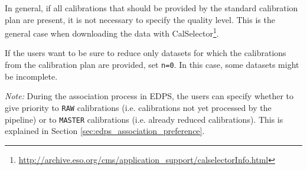 In general, if all calibrations that should be provided by the standard calibration plan are present, it is not necessary to specify the quality level. This is the general case when downloading the data with CalSelector\footnote{\url{http://archive.eso.org/cms/application_support/calselectorInfo.html}}.

If the users want to be sure to reduce only datasets for which the calibrations from the calibration plan are provided, set {\tt n=0}. In this case, some datasets might be incomplete.


{\it Note:} During the association process in EDPS, the users can specify whether to give priority to {\tt RAW} calibrations (i.e. calibrations not yet processed by the pipeline) or to {\tt MASTER} calibrations (i.e. already reduced calibrations). This is explained in Section \ref{sec:edps_association_preference}.
 

